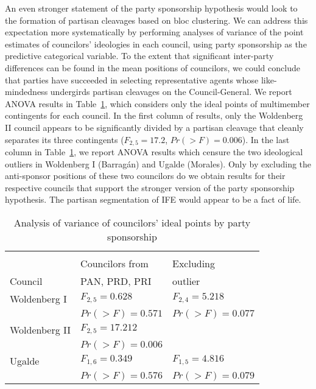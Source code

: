 \documentclass[12 pt, letter]{article}
\begin{document}
An even stronger statement of the party sponsorship hypothesis would
look to the formation of partisan cleavages based on bloc
clustering.  We can address this expectation more systematically by
performing analyses of variance of the point estimates of
councilors' ideologies in each council, using party sponsorship as
the predictive categorical variable.  To the extent that significant
inter-party differences can be found in the mean positions of
councilors, we could conclude that parties have succeeded in
selecting representative agents whose like-mindedness undergirds
partisan cleavages on the Council-General.  We report ANOVA results
in Table~\ref{T:anova}, which considers only the ideal points of
multimember contingents for each council.  In the first column of
results, only the Woldenberg II council appears to be significantly
divided by a partisan cleavage that cleanly separates its three
contingents ($F_{2,5}=17.2$, $Pr(>F)=0.006$).  In the last column in
Table~\ref{T:anova}, we report ANOVA results which censure the two
ideological outliers in Woldenberg I (Barrag\'an) and Ugalde
(Morales).  Only by excluding the anti-sponsor positions of these
two councilors do we obtain results for their respective councils
that support the stronger version of the party sponsorship
hypothesis.  The partisan segmentation of IFE would appear to be a
fact of life.

\begin{table}
\caption{Analysis of variance of councilors' ideal points by party sponsorship}\label{T:anova}
\begin{center}
\begin{tabular}{lll}
\hline\\[-1.5ex]
              & Councilors from & Excluding\\
Council       & PAN, PRD, PRI   & outlier          \\  \hline
Woldenberg I  & $F_{2,5}=0.628$ & $F_{2,4}=5.218$ \\
              & $Pr(>F)=0.571$  & $Pr(>F)=0.077$  \\
Woldenberg II & $F_{2,5}=17.212$&  \\
              & $Pr(>F)=0.006$  &  \\
Ugalde        & $F_{1,6}=0.349$ & $F_{1,5}=4.816$ \\
              & $Pr(>F)=0.576$  & $Pr(>F)=0.079$ \\ \hline
\end{tabular}
\end{center}
\end{table}
\end{document}
